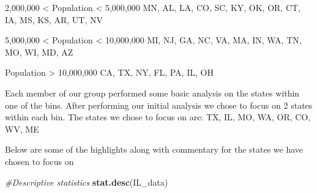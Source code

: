 \documentclass[
]{article}
\newenvironment{Shaded}{\begin{snugshade}}{\end{snugshade}}
\newcommand{\CommentTok}[1]{\textcolor[rgb]{0.56,0.35,0.01}{\textit{#1}}}
\newcommand{\KeywordTok}[1]{\textcolor[rgb]{0.13,0.29,0.53}{\textbf{#1}}}
\newcommand{\NormalTok}[1]{#1}
\newcommand{\OperatorTok}[1]{\textcolor[rgb]{0.81,0.36,0.00}{\textbf{#1}}}
\newcommand{\StringTok}[1]{\textcolor[rgb]{0.31,0.60,0.02}{#1}}
\begin{document}
2,000,000 \textless{} Population \textless{} 5,000,000 MN, AL, LA, CO,
SC, KY, OK, OR, CT, IA, MS, KS, AR, UT, NV

5,000,000 \textless{} Population \textless{} 10,000,000 MI, NJ, GA, NC,
VA, MA, IN, WA, TN, MO, WI, MD, AZ

Population \textgreater{} 10,000,000 CA, TX, NY, FL, PA, IL, OH

Each member of our group performed some basic analysis on the states
within one of the bins. After performing our initial analysis we chose
to focus on 2 states within each bin. The states we chose to focus on
are: TX, IL, MO, WA, OR, CO, WV, ME

Below are some of the highlights along with commentary for the states we
have chosen to focus on

\begin{Shaded}
\end{Shaded}

\begin{Shaded}
\begin{Highlighting}[]
\CommentTok{#Descriptive statistics}
\KeywordTok{stat.desc}\NormalTok{(IL_data)}
\end{Highlighting}
\end{Shaded}
\end{document}
